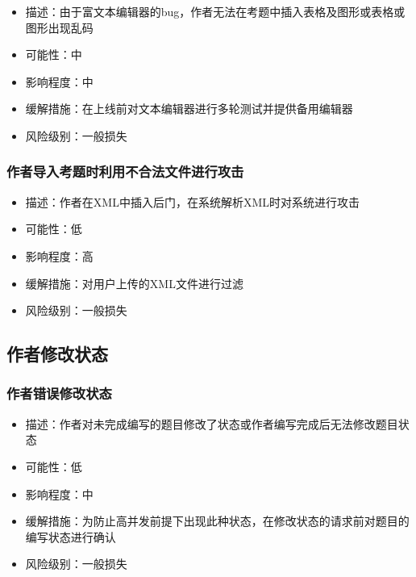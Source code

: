 \documentclass[hyperref, a4paper]{ctexart}
\providecommand{\tightlist}{%
  \setlength{\itemsep}{0pt}\setlength{\parskip}{0pt}}
\begin{document}
\begin{itemize}
\tightlist
\item
  描述：由于富文本编辑器的bug，作者无法在考题中插入表格及图形或表格或图形出现乱码
\item
  可能性：中
\item
  影响程度：中
\item
  缓解措施：在上线前对文本编辑器进行多轮测试并提供备用编辑器
\item
  风险级别：一般损失
\end{itemize}

\hypertarget{ux4f5cux8005ux5bfcux5165ux8003ux9898ux65f6ux5229ux7528ux4e0dux5408ux6cd5ux6587ux4ef6ux8fdbux884cux653bux51fb}{%
\subsubsection{作者导入考题时利用不合法文件进行攻击}\label{ux4f5cux8005ux5bfcux5165ux8003ux9898ux65f6ux5229ux7528ux4e0dux5408ux6cd5ux6587ux4ef6ux8fdbux884cux653bux51fb}}

\begin{itemize}
\tightlist
\item
  描述：作者在XML中插入后门，在系统解析XML时对系统进行攻击
\item
  可能性：低
\item
  影响程度：高
\item
  缓解措施：对用户上传的XML文件进行过滤
\item
  风险级别：一般损失
\end{itemize}

\hypertarget{ux4f5cux8005ux4feeux6539ux72b6ux6001}{%
\subsection{作者修改状态}\label{ux4f5cux8005ux4feeux6539ux72b6ux6001}}

\hypertarget{ux4f5cux8005ux9519ux8befux4feeux6539ux72b6ux6001}{%
\subsubsection{作者错误修改状态}\label{ux4f5cux8005ux9519ux8befux4feeux6539ux72b6ux6001}}

\begin{itemize}
\tightlist
\item
  描述：作者对未完成编写的题目修改了状态或作者编写完成后无法修改题目状态
\item
  可能性：低
\item
  影响程度：中
\item
  缓解措施：为防止高并发前提下出现此种状态，在修改状态的请求前对题目的编写状态进行确认
\item
  风险级别：一般损失
\end{itemize}
\end{document}

